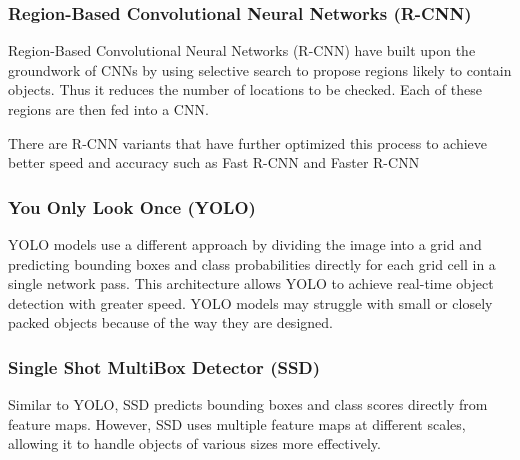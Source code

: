 \subsubsection{Region-Based Convolutional Neural Networks (R-CNN)} 
Region-Based Convolutional Neural Networks (R-CNN) have built upon the groundwork of CNNs by using selective search to propose regions likely to contain objects. Thus it reduces the number of locations to be checked. Each of these regions are then fed into a CNN. 

There are R-CNN variants that have further optimized this process to achieve better speed and accuracy such as Fast R-CNN \citep{girshick2015fast} and Faster R-CNN \citep{ren2016faster}

\subsubsection{You Only Look Once (YOLO)}
YOLO \citep{redmon2016look} models use a different approach by dividing the image into a grid and predicting bounding boxes and class probabilities directly for each grid cell in a single network pass. This architecture allows YOLO to achieve real-time object detection with greater speed. YOLO models may struggle with small or closely packed objects because of the way they are designed.

\subsubsection{Single Shot MultiBox Detector (SSD)}
Similar to YOLO, SSD predicts bounding boxes and class scores directly from feature maps. However, SSD uses multiple feature maps at different scales, allowing it to handle objects of various sizes more effectively.





